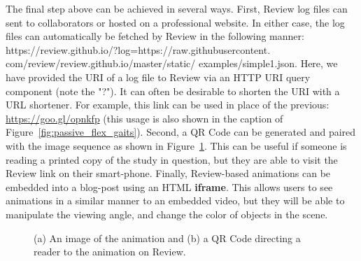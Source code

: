 The final step above can be achieved in several ways. First, Review log files can sent to collaborators or hosted on a professional website. In either case, the log files can automatically be fetched by Review in the following manner: https://review.github.io/?log=https://raw.githubusercontent. com/review/review.github.io/master/static/ examples/simple1.json.
%
Here, we have provided the URI of a log file to Review via an HTTP URI query component (note the "?").
%
It can often be desirable to shorten the URI with a URL shortener. For example, this link can be used in place of the previous: \url{https://goo.gl/opnkfp} (this usage is also shown in the caption of Figure~\ref{fig:passive_flex_gaits}).
%
Second, a QR Code can be generated and paired with the image sequence as shown in Figure~\ref{fig:sphere_qr}.
%
This can be useful if someone is reading a printed copy of the study in question, but they are able to visit the Review link on their smart-phone.
%
Finally, Review-based animations can be embedded into a blog-post using an HTML \textbf{iframe}.
%
This allows users to see animations in a similar manner to an embedded video, but they will be able to manipulate the viewing angle, and change the color of objects in the scene.


\begin{figure}[htb!]
    \centering

    \hfil%

    \caption{(a) An image of the animation and (b) a QR Code directing a reader to the animation on Review.}
    \label{fig:sphere_qr}

\end{figure}



